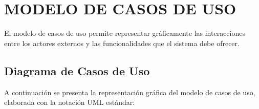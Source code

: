 \documentclass[12pt, letterpaper, oneside]{report}
\begin{document}
\newpage

\chapter{MODELO DE CASOS DE USO}

El modelo de casos de uso permite representar gr\'aficamente las interacciones entre los actores externos y las funcionalidades que el sistema debe ofrecer.

\section{Diagrama de Casos de Uso}

A continuaci\'on se presenta la representaci\'on gr\'afica del modelo de casos de uso, elaborada con la notaci\'on UML est\'andar:
\end{document}
